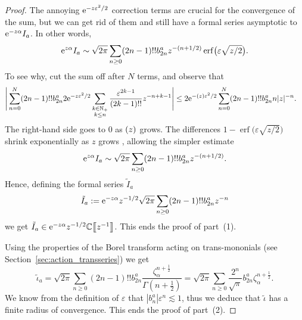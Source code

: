 \documentclass[10pt,a4paper]{amsart}
\let\Re\relax
\DeclareMathOperator{\Re}{Re}
\newcommand{\C}{\mathbb{C}}
\newcommand{\series}[1]{\tilde{#1}}
\numberwithin{equation}{section}
\begin{document}
\begin{proof}
The annoying ${\rm e}^{-z\varepsilon^2/2}$ correction terms are crucial for the convergence of the sum, but we can get rid of them and still have a formal series asymptotic to ${\rm e}^{-z \alpha} I_a$. In other words,
\[ {\rm e}^{z \alpha} I_a \sim \sqrt{2\pi} \sum_{n \ge 0} (2n-1)!! b_{2n}^a z^{-(n+1/2)} \operatorname{erf}\bigl(\varepsilon \sqrt{z/2}\bigr). \]
To see why, cut the sum off after $N$ terms, and observe that
\begin{align*}
 \Bigg | \sum_{n= 0}^N(2n-1)!! b_{2n}^a 2{\rm e}^{-z\varepsilon^2/2} \sum_{\substack{k \in \mathbb{N}_+ \\ k \le n}} \frac{\varepsilon^{2k-1}}{(2k-1)!!} z^{-n+k-1} \Bigg | &\leq 2 {\rm e}^{-\Re (z) \varepsilon^2/2} \sum_{n=0}^N(2n-1)!! b_{2n}^a n|z|^{-n}.
\end{align*}
The right-hand side goes to $0$ as $\Re(z)$ grows. The differences $1 - \operatorname{erf}\bigl(\varepsilon \sqrt{z/2}\bigr)$ shrink exponentially as $z$ grows \cite[inequality~(5)]{chiani-dardari-book}, allowing the simpler estimate
\[ {\rm e}^{z\alpha} I_a \sim \sqrt{2\pi} \sum_{n \ge 0} (2n-1)!! b_{2n}^a z^{-(n+1/2)}. \]
Hence, defining the formal series $\series{I}_a$
\[\series{I}_a := {\rm e}^{-z\alpha} z^{-1/2} \sqrt{2\pi} \sum_{n \ge 0} (2n-1)!! b_{2n}^a z^{-n}\]
we get $\series{I}_a \in {\rm e}^{-z\alpha}z^{-1/2}\C\big\llbracket z^{-1}\big\rrbracket$. This ends the proof of part~(1).

Using the properties of the Borel transform acting on trans-mononials (see Section~\ref{sec:action_transseries}) we get
\begin{equation*}
\series{\iota}_a = \sqrt{2\pi} \sum_{n \ge 0} (2n - 1)!! b_{2n}^a \frac{\zeta_\alpha^{n+\frac{1}{2}}}{\Gamma(n+\frac{1}{2})} = \sqrt{2\pi} \sum_{n \ge 0} \frac{2^n}{\sqrt{\pi}} b_{2n}^a \zeta_\alpha^{n+\frac{1}{2}}.
\end{equation*}
We know from the definition of $\varepsilon$ that $\left|b_n^a\right| \varepsilon^n \lesssim 1$, thus we deduce that $\series{\iota}$ has a finite radius of convergence. This ends the proof of part~(2).


\end{proof}
\end{document}
